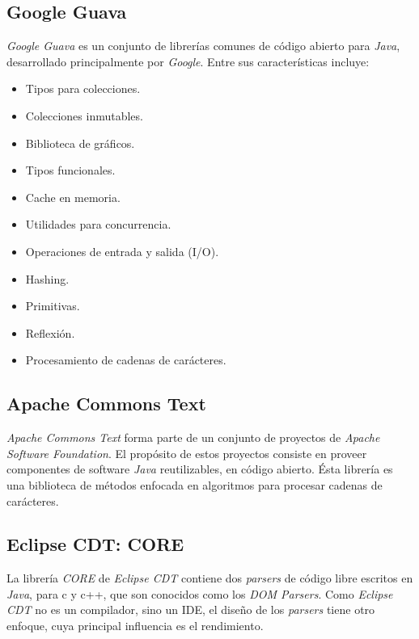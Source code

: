 \subsection{Google Guava}

\textit{Google Guava} es un conjunto de librerías comunes de código abierto para \textit{Java},
desarrollado principalmente por \textit{Google}. Entre sus características incluye: 

\begin{itemize}
  \item Tipos para colecciones.
  \item Colecciones inmutables.
  \item Biblioteca de gráficos.
  \item Tipos funcionales.  
  \item Cache en memoria.  
  \item Utilidades para concurrencia.
  \item Operaciones de entrada y salida (I/O).  
  \item Hashing.
  \item Primitivas.
  \item Reflexión.
  \item Procesamiento de cadenas de carácteres.
\end{itemize}

\subsection{Apache Commons Text}
\label{subsec:apache}

\textit{Apache Commons Text} forma parte de un conjunto de proyectos de \textit{Apache Software Foundation}.
El propósito de estos proyectos consiste en proveer componentes de software \textit{Java} reutilizables, en código abierto.
Ésta librería es una biblioteca de métodos enfocada en algoritmos para procesar cadenas de carácteres.

\subsection{Eclipse CDT: CORE}

La librería \textit{CORE} de \textit{Eclipse CDT} contiene 
dos \textit{parsers} de código libre escritos en \textit{Java},
para c y c++, que son conocidos como los \textit{DOM Parsers}.
Como \textit{Eclipse CDT} no es un compilador, sino un \ac{IDE},
el diseño de los \textit{parsers} tiene otro enfoque,
cuya principal influencia es el rendimiento.

